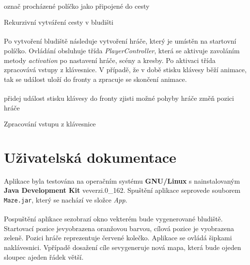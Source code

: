\documentclass[12pt]{scrartcl}
\begin{document}
\paragraph{}
\begin{algorithm}[H]
	\BlankLine
	označ procházené políčko jako připojené do cesty
	\BlankLine
 \caption{Rekurzivní vytváření cesty v bludišti}
\end{algorithm}

\paragraph{}
Po vytvoření bludiště následuje vytvoření hráče, který je umístěn na startovní políčko. Ovládání obsluhuje třída \emph{PlayerController}, která se aktivuje zavoláním metody \emph{activation} po nastavení hráče, scény a kresby. Po aktivaci třída zpracovává vstupy z klávesnice. V případě, že v době stisku klávesy běží animace, tak se událost uloží do fronty a zpracuje se skončení animace. 

\paragraph{}
\begin{algorithm}[H]
		{přidej událost stisku klávesy do fronty}
		{
			zjisti možné pohyby hráče
			\BlankLine
			 {
				změň pozici hráče
			}
		}
 \caption{Zpracování vstupu z klávesnice}
\end{algorithm}

\section{Uživatelská dokumentace}
\paragraph{}
Aplikace byla testována na operačním systému \textbf{GNU/Linux} s nainstalovaným \textbf{Java Development Kit} ve\nobreakspace verzi.0\_162.
Spuštění aplikace se\nobreakspace provede souborem \texttt{Maze.jar}, který se nachází ve složce \emph{App}.

\paragraph{}
Po\nobreakspace spuštění aplikace se\nobreakspace zobrazí okno ve\nobreakspace kterém bude vygenerované bludiště. Startovací pozice je\nobreakspace vyobrazena oranžovou barvou, cílová pozice je vyobrazena zeleně. Pozici hráče reprezentuje červené kolečko. Aplikace se ovládá šipkami na\nobreakspace klávesnici. V\nobreakspace případě dosažení cíle se\nobreakspace vygeneruje nová mapa, která bude o\nobreakspace jeden sloupec a\nobreakspace jeden řádek větší.
\end{document}
